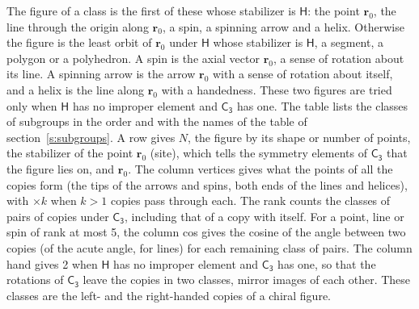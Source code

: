 \documentclass[10pt,a4paper]{article}
\numberwithin{equation}{section}
\newcommand{\grp}[1]{\mathsf{#1}}
\newcommand{\pointr}{\mathbf{r}}
\begin{document}
\leavevmode\label{n:head.figure}The figure of a class is the first of these whose stabilizer is $\grp{H}$: the point $\pointr_0$, the line through the origin along $\pointr_0$, a spin, a spinning arrow and a helix. Otherwise the figure is the least orbit of $\pointr_0$ under $\grp{H}$ whose stabilizer is $\grp{H}$, a segment, a polygon or a polyhedron. A spin is the axial vector $\pointr_0$, a sense of rotation about its line. A spinning arrow is the arrow $\pointr_0$ with a sense of rotation about itself, and a helix is the line along $\pointr_0$ with a handedness. These two figures are tried only when $\grp{H}$ has no improper element and $\grp{C_{3}}$ has one. The table lists the classes of subgroups in the order and with the names of the table of section~\ref{s:subgroups}. \label{n:head.site}A row gives $N$, the figure by its shape or number of points, the stabilizer of the point $\pointr_0$ (site), which tells the symmetry elements of $\grp{C_{3}}$ that the figure lies on, and $\pointr_0$. \label{n:head.vertices}The column vertices gives what the points of all the copies form (the tips of the arrows and spins, both ends of the lines and helices), with ${\times}k$ when $k > 1$ copies pass through each. \label{n:head.rank}The rank counts the classes of pairs of copies under $\grp{C_{3}}$, including that of a copy with itself. \label{n:head.cos}For a point, line or spin of rank at most 5, the column cos gives the cosine of the angle between two copies (of the acute angle, for lines) for each remaining class of pairs. \label{n:head.hand}The column hand gives 2 when $\grp{H}$ has no improper element and $\grp{C_{3}}$ has one, so that the rotations of $\grp{C_{3}}$ leave the copies in two classes, mirror images of each other. These classes are the left- and the right-handed copies of a chiral figure.
\end{document}
